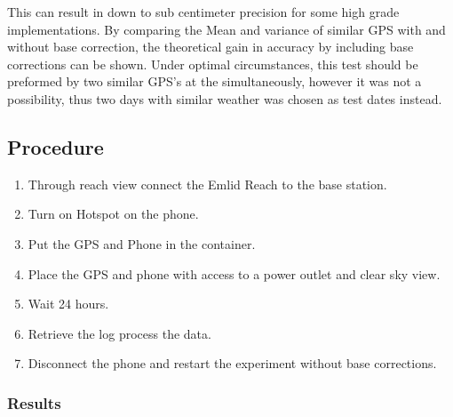 This can result in down to sub centimeter precision for some high grade implementations.
By comparing the Mean and variance of similar GPS with and without base correction, the theoretical gain in accuracy by including base corrections can be shown.
Under optimal circumstances, this test should be preformed by two similar GPS's at the simultaneously, however it was not a possibility, thus two days with similar weather was chosen as test dates instead.

\subsection*{Procedure}

\begin{enumerate}
	\item Through reach view connect the Emlid Reach to the base station.
	\item Turn on Hotspot on the phone.
	\item Put the GPS and Phone in the container.
	\item Place the GPS and phone with access to a power outlet and clear sky view.
	\item Wait 24 hours.
	\item Retrieve the log process the data.
	\item Disconnect the phone and restart the experiment without base corrections.
	
\end{enumerate}

\subsubsection*{Results}
